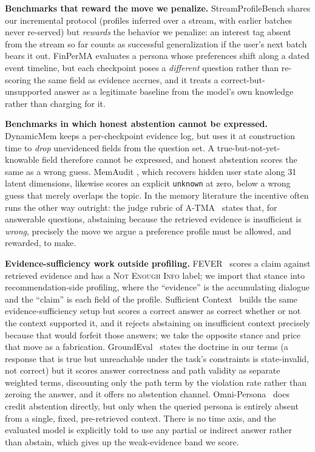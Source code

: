\documentclass{article}
\begin{document}
\textbf{Benchmarks that reward the move we penalize.} StreamProfileBench
\citep{wang2026streamprofilebench} shares our incremental protocol (profiles inferred over a
stream, with earlier batches never re-served) but \emph{rewards} the behavior we penalize: an
interest tag absent from the stream so far counts as successful generalization if the user's next
batch bears it out. FinPerMA \citep{wang2026finperma} evaluates a persona whose preferences shift
along a dated event timeline, but each checkpoint poses a \emph{different} question rather than
re-scoring the same field as evidence accrues, and it treats a correct-but-unsupported answer as a
legitimate baseline from the model's own knowledge rather than charging for it.

\textbf{Benchmarks in which honest abstention cannot be expressed.} DynamicMem
\citep{xie2026dynamicmem} keeps a per-checkpoint evidence log, but uses it at construction time to
\emph{drop} unevidenced fields from the question set. A true-but-not-yet-knowable field therefore
cannot be expressed, and honest abstention scores the same as a wrong guess. MemAudit
\citep{ma2026memprobe}, which recovers hidden user state along 31 latent dimensions, likewise scores
an explicit \texttt{unknown} at zero, below a wrong guess that merely overlaps the topic. In the
memory literature the incentive often runs the other way outright: the judge rubric of
A-TMA~\citep{shi2026atma} states that, for answerable questions, abstaining because the retrieved
evidence is insufficient is \emph{wrong}, precisely the move we argue a preference profile must be
allowed, and rewarded, to make.

\textbf{Evidence-sufficiency work outside profiling.} FEVER~\citep{thorne2018fever} scores a claim
against retrieved evidence and has a \textsc{Not Enough Info} label; we import that stance into
recommendation-side profiling, where the ``evidence'' is the accumulating dialogue and the ``claim''
is each field of the profile. Sufficient Context~\citep{joren2024sufficient} builds the same
evidence-sufficiency setup but scores a correct answer as correct whether or not the context
supported it, and it rejects abstaining on insufficient context precisely because that would forfeit
those answers; we take the opposite stance and price that move as a fabrication.
GroundEval~\citep{flynt2026groundeval} states the doctrine in our terms (a response that is true
but unreachable under the task's constraints is state-invalid, not correct) but it scores answer
correctness and path validity as separate weighted terms, discounting only the path term by the
violation rate rather than zeroing the answer, and it offers no abstention channel.
Omni-Persona~\citep{oh2026omnipersona} does credit abstention directly, but only when the queried
persona is entirely absent from a single, fixed, pre-retrieved context. There is no time axis, and
the evaluated model is explicitly told to use any partial or indirect answer rather than abstain,
which gives up the weak-evidence band we score.

\newpage

\end{document}
